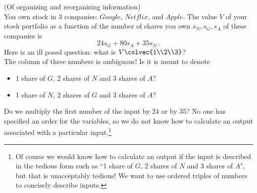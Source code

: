\begin{example} (Of organizing and reorganizing information)\\ \label{OrderInfo}
You own stock in 3 companies: $Google$, $Netflix$, and $Apple$. 
The value $V$ of your stock portfolio as a function of the number of shares you own $s_{N}, s_{G},s_{A}$ of these companies 
 is %
\[
24s_{G}+80s_{A}+35s_{N}\,.\]
Here is an ill posed question: what is $V\colvec{1\\2\\3} $?\\

The column of three numbers is ambiguous! 
Is it is meant to denote %
\begin{itemize}
\item 1 share of ${G}$, 2 shares of ${N}$ and 3 shares of ${A}$? 
\item 1 share of ${N}$, 2 shares of ${G}$ and 3 shares of ${A}$?  
\end{itemize}
Do we multiply the first number of the input by 24 or by 35? 
No one has specified an order for the variables, 
so we do not know how to calculate an output associated with a particular input.\!\footnote{Of course we would know how to calculate an output if the input is described in the tedious form such as ``1 share of ${G}$, 2 shares of ${N}$ and 3 shares of ${A}$", but that is unacceptably tedious! We want to use ordered triples of numbers to concisely describe inputs.}%


\end{example}
